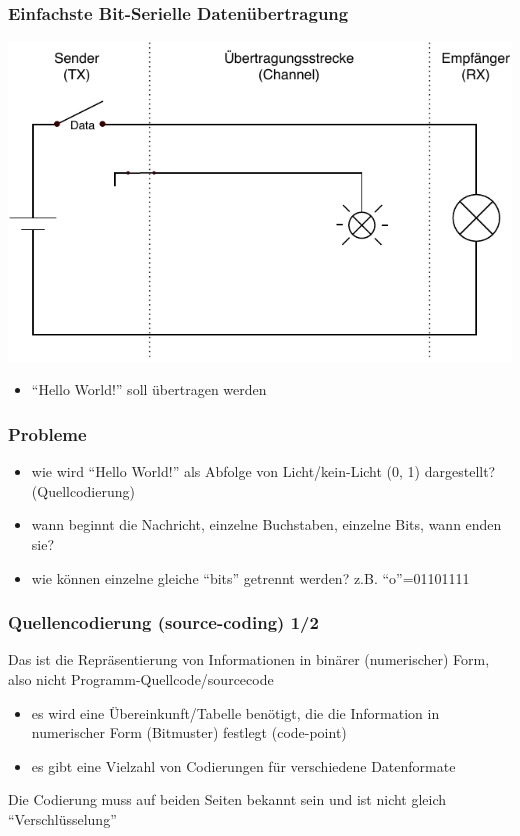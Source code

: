 \documentclass[ignorenonframetext]{beamer}
\begin{document}
\begin{frame}
\frametitle{Einfachste Bit-Serielle Daten\"ubertragung}
\includegraphics{simplest-serial}

\begin{itemize}
  \item ``Hello World!'' soll \"ubertragen werden
\end{itemize}
\end{frame}


\begin{frame}
\frametitle{Probleme}
\begin{itemize}
  \item wie wird ``Hello World!'' als Abfolge von Licht/kein-Licht (0, 1) dargestellt? (Quellcodierung)
  \item wann beginnt die Nachricht, einzelne Buchstaben, einzelne Bits, wann enden sie?
  \item wie k\"onnen einzelne gleiche ``bits'' getrennt werden? z.B. ``o''=01101111
\end{itemize}
\end{frame}


\begin{frame}
\frametitle{Quellencodierung (source-coding) 1/2}
\begin{block}{}
  Das ist die Repr\"asentierung von Informationen in bin\"arer (numerischer) Form, 
  also nicht Programm-Quellcode/sourcecode
\end{block}

\begin{itemize}
  \item es wird eine \"Ubereinkunft/Tabelle ben\"otigt, die die Information in numerischer Form (Bitmuster) festlegt (code-point)
  \item es gibt eine Vielzahl von Codierungen f\"ur verschiedene Datenformate
\end{itemize}
  \begin{block}{}{Die Codierung muss auf beiden Seiten bekannt sein und ist nicht gleich ``Verschl\"usselung''}\end{block}
\end{frame}
\end{document}
